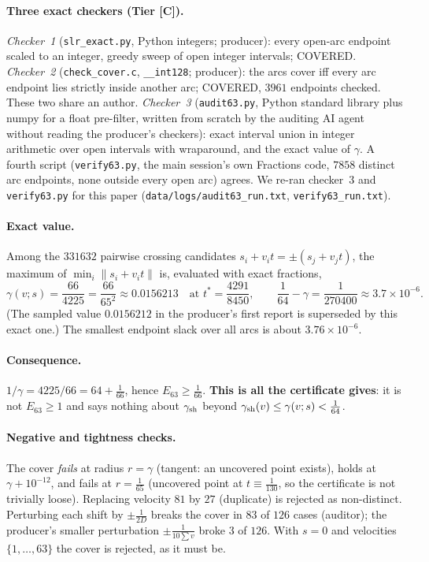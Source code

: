 \documentclass[10pt]{article}
\newcommand{\tier}[1]{\textsf{[#1]}}
\newcommand{\tC}{\tier{C}}
\begin{document}
\paragraph{Three exact checkers (Tier \tC{}).}
\emph{Checker~1} (\texttt{slr\_exact.py}, Python integers; producer): every open-arc endpoint scaled to an integer, greedy sweep of open integer intervals; COVERED. \emph{Checker~2} (\texttt{check\_cover.c}, \texttt{\_\_int128}; producer): the arcs cover iff every arc endpoint lies strictly inside another arc; COVERED, $3961$ endpoints checked. These two share an author. \emph{Checker~3} (\texttt{audit63.py}, Python standard library plus numpy for a float pre-filter, written from scratch by the auditing AI agent without reading the producer's checkers): exact interval union in integer arithmetic over open intervals with wraparound, and the exact value of $\gamma$. A fourth script (\texttt{verify63.py}, the main session's own Fractions code, $7858$ distinct arc endpoints, none outside every open arc) agrees. We re-ran checker~3 and \texttt{verify63.py} for this paper (\texttt{data/logs/audit63\_run.txt}, \texttt{verify63\_run.txt}).
\paragraph{Exact value.} Among the $331632$ pairwise crossing candidates $s_i+v_it=\pm(s_j+v_jt)$, the maximum of $\min_i\|s_i+v_it\|$ is, evaluated with exact fractions,
\[
\gamma(v;s)=\frac{66}{4225}=\frac{66}{65^2}\approx0.0156213\quad\text{at }t^\ast=\frac{4291}{8450},\qquad \frac1{64}-\gamma=\frac1{270400}\approx3.7\times10^{-6}.
\]
(The sampled value $0.0156212$ in the producer's first report is superseded by this exact one.) The smallest endpoint slack over all arcs is about $3.76\times10^{-6}$.
\paragraph{Consequence.} $1/\gamma=4225/66=64+\frac1{66}$, hence $E_{63}\ge\frac1{66}$. \textbf{This is all the certificate gives}: it is not $E_{63}\ge1$ and says nothing about $\gamma_{\rm sh}$ beyond $\gamma_{\rm sh}(v)\le\gamma(v;s)<\frac1{64}$.
\paragraph{Negative and tightness checks.} The cover \emph{fails} at radius $r=\gamma$ (tangent: an uncovered point exists), holds at $\gamma+10^{-12}$, and fails at $r=\frac1{65}$ (uncovered point at $t\equiv\frac1{130}$, so the certificate is not trivially loose). Replacing velocity $81$ by $27$ (duplicate) is rejected as non-distinct. Perturbing each shift by $\pm\frac1{2D}$ breaks the cover in $83$ of $126$ cases (auditor); the producer's smaller perturbation $\pm\frac1{10\sum v}$ broke $3$ of $126$. With $s=0$ and velocities $\{1,\dots,63\}$ the cover is rejected, as it must be.
\end{document}
